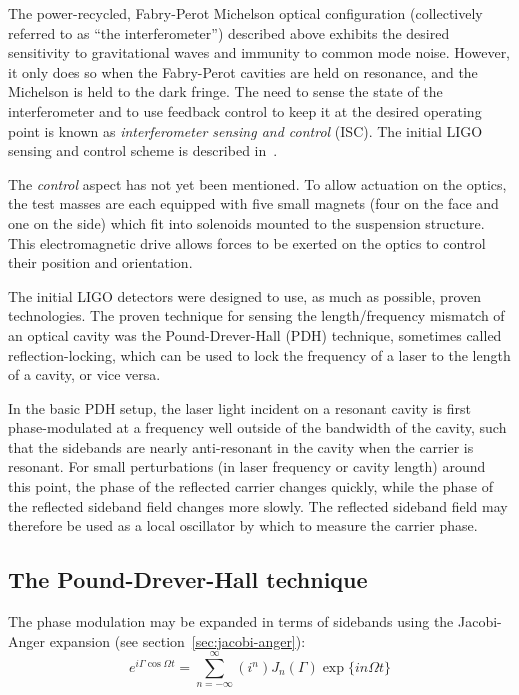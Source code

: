 The power-recycled, Fabry-Perot Michelson optical configuration
(collectively referred to as ``the interferometer'') described above
exhibits the desired sensitivity to gravitational waves and immunity
to common mode noise.  However, it only does so when the Fabry-Perot
cavities are held on resonance, and the Michelson is held to the dark
fringe.  The need to sense the state of the interferometer and to use
feedback control to keep it at the desired operating point is known as
\emph{interferometer sensing and control} (ISC).  The initial LIGO
sensing and control scheme is described
in~\cite{Fritschel2001Readout}.

The \emph{control} aspect has not yet been mentioned.  To allow
actuation on the optics, the test masses are each equipped with five
small magnets (four on the face and one on the side) which fit into
solenoids mounted to the suspension structure.  This electromagnetic
drive allows forces to be exerted on the optics to control their
position and orientation.
 
The initial LIGO detectors were designed to use, as much as possible,
proven technologies.  The proven technique for sensing the
length/frequency mismatch of an optical cavity was the
Pound-Drever-Hall (PDH)
technique\cite{Drever1983Laser,Black2001Introduction}, sometimes
called reflection-locking, which can be used to lock the frequency of
a laser to the length of a cavity, or vice versa.

In the basic PDH setup, the laser light incident on a resonant cavity
is first phase-modulated at a frequency well outside of the bandwidth
of the cavity, such that the sidebands are nearly anti-resonant in the
cavity when the carrier is resonant.  For small perturbations (in
laser frequency or cavity length) around this point, the phase of the
reflected carrier changes quickly, while the phase of the reflected
sideband field changes more slowly.  The reflected sideband field may
therefore be used as a local oscillator by which to measure the
carrier phase.

\subsection{The Pound-Drever-Hall technique}

The phase modulation may be expanded in terms of sidebands using the
Jacobi-Anger expansion (see section~\ref{sec:jacobi-anger}):
%
\begin{equation}
e^{i\Gamma\cos\Omega t} = \sum_{n=-\infty}^{\infty} \left(i^n\right)  J_n(\Gamma) \exp\{i n \Omega t\} 
\end{equation}

